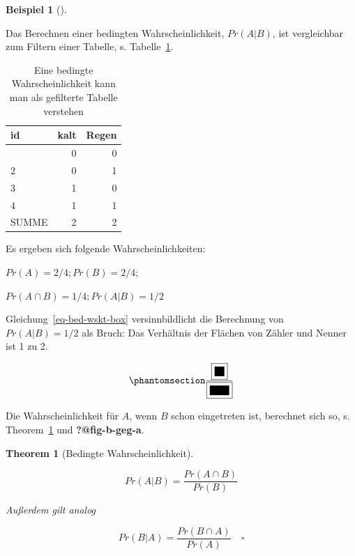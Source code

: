 \documentclass[
  ngerman,
  letterpaper,
  twoside,
  open=any]{scrbook}
\theoremstyle{definition}
\newtheorem{example}{Beispiel}[chapter]
\theoremstyle{plain}
\newtheorem{theorem}{Theorem}[chapter]
\theoremstyle{definition}
\theoremstyle{definition}
\theoremstyle{remark}
\begin{document}
\begin{example}[]\protect\hypertarget{exm-kalt-regen-filter}{}\label{exm-kalt-regen-filter}

Das Berechnen einer bedingten Wahrscheinlichkeit, \(Pr(A|B)\), ist
vergleichbar zum Filtern einer Tabelle, s. Tabelle~\ref{tbl-bed-wskt}.

{

\begin{longtable}[]{@{}lrr@{}}

\caption{\label{tbl-bed-wskt}Eine bedingte Wahrscheinlichkeit kann man
als gefilterte Tabelle verstehen}

\tabularnewline

\toprule\noalign{}
id & kalt & Regen \\
\midrule\noalign{}
\endhead
\bottomrule\noalign{}
\endlastfoot
1 & 0 & 0 \\
2 & 0 & 1 \\
3 & 1 & 0 \\
4 & 1 & 1 \\
SUMME & 2 & 2 \\

\end{longtable}

}

Es ergeben sich folgende Wahrscheinlichkeiten:

\(Pr(A) = 2/4; Pr(B) = 2/4;\)

\(Pr(A \cap B) = 1/4; Pr(A|B) = 1/2\)

Gleichung~\ref{eq-bed-wskt-box} versinnbildlicht die Berechnung von
\(Pr(A|B)= 1/2\) als Bruch: Das Verhältnis der Flächen von Zähler und
Nenner ist 1 zu 2.

\begin{equation}\protect\phantomsection\label{eq-bed-wskt-box}{\frac{\boxed{\rule{1em}{1em}}}{\boxed{\rule{2em}{1em}}}}\end{equation}

Die Wahrscheinlichkeit für \(A\), wenn \(B\) schon eingetreten ist,
berechnet sich so, s. Theorem~\ref{thm-pr-cond} und
\textbf{?@fig-b-geg-a}.

\begin{theorem}[Bedingte
Wahrscheinlichkeit]\protect\hypertarget{thm-pr-cond}{}\label{thm-pr-cond}

\[Pr(A|B) = \frac{Pr(A \cap B)}{Pr(B)}\]

Außerdem gilt analog

\[Pr(B|A) = \frac{Pr(B \cap A)}{Pr(A)} \quad \square\]

\end{theorem}


\end{example}
\end{document}
